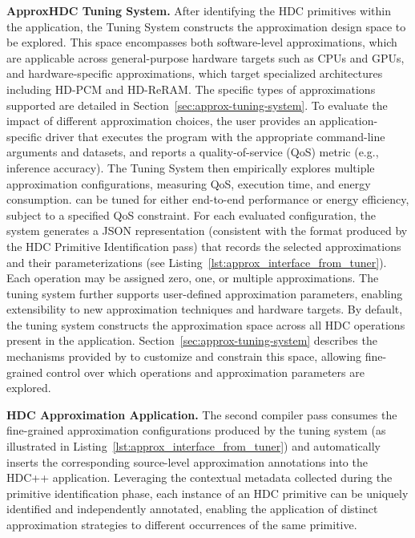 


\textbf{ApproxHDC Tuning System.}
After identifying the HDC primitives within the application, the \pname{} Tuning System constructs the approximation design space to be explored. This space encompasses both software-level approximations, which are applicable across general-purpose hardware targets such as CPUs and GPUs, and hardware-specific approximations, which target specialized architectures including HD-PCM and HD-ReRAM. The specific types of approximations supported are detailed in Section~\ref{sec:approx-tuning-system}.
To evaluate the impact of different approximation choices, the user provides an application-specific driver that executes the program with the appropriate command-line arguments and datasets, and reports a quality-of-service (QoS) metric (e.g., inference accuracy). The \pname{} Tuning System then empirically explores multiple approximation configurations, measuring QoS, execution time, and energy consumption. \pname{} can be tuned for either end-to-end performance or energy efficiency, subject to a specified QoS constraint.
For each evaluated configuration, the system generates a JSON representation (consistent with the format produced by the HDC Primitive Identification pass) that records the selected approximations and their parameterizations (see Listing~\ref{lst:approx_interface_from_tuner}). Each operation may be assigned zero, one, or multiple approximations. The tuning system further supports user-defined approximation parameters, enabling extensibility to new approximation techniques and hardware targets. By default, the tuning system constructs the approximation space across all HDC operations present in the application. Section~\ref{sec:approx-tuning-system} describes the mechanisms provided by \pname{} to customize and constrain this space, allowing fine-grained control over which operations and approximation parameters are explored.



\textbf{HDC Approximation Application.}
The second compiler pass consumes the fine-grained approximation configurations produced by the tuning system (as illustrated in Listing~\ref{lst:approx_interface_from_tuner}) and automatically inserts the corresponding source-level approximation annotations into the HDC++ application. Leveraging the contextual metadata collected during the primitive identification phase, each instance of an HDC primitive can be uniquely identified and independently annotated, enabling the application of distinct approximation strategies to different occurrences of the same primitive.

